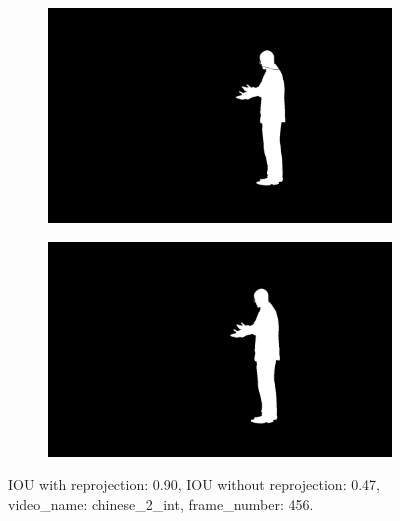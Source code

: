 \begin{figure}
\begin{subfigure}[t]{0.19\textwidth}
\end{subfigure}
\begin{subfigure}[t]{0.19\textwidth}
\centering
\includegraphics[scale=0.07]{good_examples/visual_81815_w_np.png}
\end{subfigure}
\begin{subfigure}[t]{0.19\textwidth}
\centering
\includegraphics[scale=0.07]{good_examples/visual_81815_wo_np.png}
\end{subfigure}
\caption{IOU with reprojection: 0.90, IOU without reprojection: 0.47, video\_name: chinese\_2\_int, frame\_number: 456.}
\end{figure}


